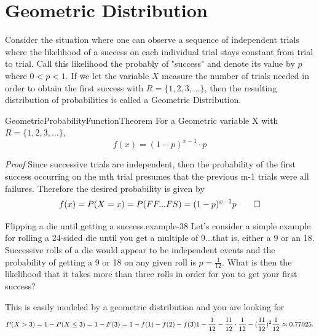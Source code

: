 \documentclass[10pt,]{book}
\makeatletter
\renewcommand*{\proofname}{Proof}
\renewenvironment{proof}[1][\proofname]{\par
  \pushQED{\qed}%
  \normalfont \topsep6\p@\@plus6\p@\relax
  \trivlist
  \item\relax
    {\itshape
    #1\@addpunct{.}}\hspace\labelsep\ignorespaces
}{%
  \popQED\endtrivlist\@endpefalse
}
\numberwithin{equation}{section}
\newcommand{\lt}{<}
\makeatother
\begin{document}
\section[{Geometric Distribution}]{Geometric Distribution}\label{section-47}
\hypertarget{p-929}{}%
Consider the situation where one can observe a sequence  of independent trials where the likelihood of a success on each individual trial stays constant from trial to trial. Call this likelihood the probably of "success" and denote its value by \(p\) where \(0 \lt p \lt 1 \). If we let the variable \(X\) measure the number of trials needed in order to obtain the first success with \(R = \{1, 2, 3, ... \}\), then the resulting distribution of probabilities is called a Geometric Distribution.%
\par
\hypertarget{p-930}{}%
\begin{theorem}{}{}{GeometricProbabilityFunctionTheorem}%
\hypertarget{GeometricProbabilityFunction}{}%
For a Geometric variable X with \(R = \{1, 2, 3, ... \}\),%
\begin{equation*}
f(x) = (1-p)^{x-1} \cdot p
\end{equation*}
%
\end{theorem}
\begin{proof}\hypertarget{proof-42}{}
\hypertarget{p-932}{}%
Since successive trials are independent, then the probability of the first success occurring on the mth trial presumes that the previous m-1 trials were all failures.  Therefore the desired probability is given by%
\begin{equation*}
f(x) = P(X = x) = P(FF...FS) = (1-p)^{x-1}p\qedhere
\end{equation*}
%
\end{proof}
%
\begin{example}{Flipping a die until getting a success.}{example-38}%
\hypertarget{p-933}{}%
Let's consider a simple example for rolling a 24-sided die until you get a multiple of 9...that is, either a 9 or an 18. Successive rolls of a die would appear to be independent events and the probability of getting a 9 or 18 on any given roll is \(p = \frac{1}{12}\). What is then the likelihood that it takes more than three rolls in order for you to get your first success?%
\par
\hypertarget{p-934}{}%
This is easily modeled by a geometric distribution and you are looking for%
\begin{equation*}
P(X > 3) = 1 - P(X \le 3) = 1 - F(3) = 1 - f(1) - f(2) - f(3) \\
1 - \frac{1}{12} - \frac{11}{12} \cdot \frac{1}{12} - (\frac{11}{12})^2 \frac{1}{12} \approx 0.77025.
\end{equation*}
%
\end{example}
\end{document}
